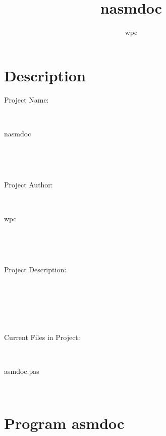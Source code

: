 \documentclass[10pt, a4paper]{report}
\title{nasmdoc}
\author{wpc}
\begin{document}
\maketitle

\tableofcontents
\pagebreak

\chapter{Description}
\begin{tabbing}
\parbox{14cm}{Project Name:}\\

\parbox{14cm}{nasmdoc}\\

\parbox{14cm}{}\\

\parbox{14cm}{Project Author: }\\

\parbox{14cm}{wpc}\\

\parbox{14cm}{}\\

\parbox{14cm}{Project Description:}\\

\parbox{14cm}{}\\

\parbox{14cm}{}\\

\parbox{14cm}{Current Files in Project: }\\

\parbox{14cm}{asmdoc.pas}\\

\end{tabbing}
\chapter{Program asmdoc}

\end{document}
